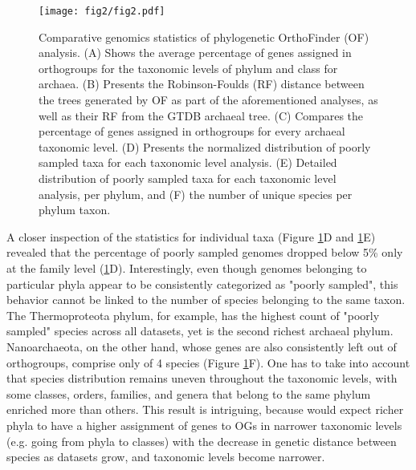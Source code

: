 \begin{figure}[H]
    \centering
    \texttt{[image: fig2/fig2.pdf]}
    \caption{Comparative genomics statistics of phylogenetic OrthoFinder (OF) analysis. (A) Shows the average percentage of genes assigned in orthogroups for the taxonomic levels of phylum and class for archaea. (B) Presents the Robinson-Foulds (RF) distance between the trees generated by OF as part of the aforementioned analyses, as well as their RF from the GTDB archaeal tree. (C) Compares the percentage of genes assigned in orthogroups for every archaeal taxonomic level. (D) Presents the normalized distribution of poorly sampled taxa for each taxonomic level analysis. (E) Detailed distribution of poorly sampled taxa for each taxonomic level analysis, per phylum, and (F) the number of unique species per phylum taxon.}
    \label{orthofinder_stats_figure}
\end{figure}   

A closer inspection of the statistics for individual taxa (Figure \ref{orthofinder_stats_figure}D and \ref{orthofinder_stats_figure}E) revealed that the percentage of poorly sampled genomes dropped below 5\% only at the family level (\ref{orthofinder_stats_figure}D). Interestingly, even though genomes belonging to particular phyla appear to be consistently categorized as "poorly sampled", this behavior cannot be linked to the number of species belonging to the same taxon. The Thermoproteota phylum, for example, has the highest count of "poorly sampled" species across all datasets, yet is the second richest archaeal phylum. Nanoarchaeota, on the other hand, whose genes are also consistently left out of orthogroups, comprise only of 4 species (Figure \ref{orthofinder_stats_figure}F). One has to take into account that species distribution remains uneven throughout the taxonomic levels, with some classes, orders, families, and genera that belong to the same phylum enriched more than others. This result is intriguing, because would expect richer phyla to have a higher assignment of genes to OGs in narrower taxonomic levels (e.g. going from phyla to classes) with the decrease in genetic distance between species as datasets grow, and taxonomic levels become narrower.  


